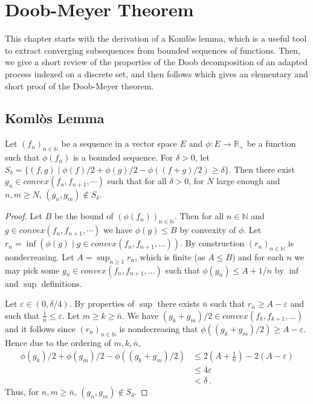 \chapter{Doob-Meyer Theorem}
\label{chap:doob_meyer}


This chapter starts with the derivation of a Komlòs lemma, which is a useful tool to extract converging subsequences from bounded sequences of functions.
Then, we give a short review of the properties of the Doob decomposition of an adapted process indexed on a discrete set, and then follows \cite{Beiglböck_Schachermayer_Veliyev_2012} which gives an elementary and short proof of the Doob-Meyer theorem.




\section{Komlòs Lemma}



\begin{lemma}\label{lem:komlos_convex}
  \leanok
Let $(f_n)_{n\in\mathbb{N}}$ be a sequence in a vector space $E$ and $\phi : E \to \mathbb{R}_+$ be a function such that $\phi(f_n)$ is a bounded sequence.
For $\delta > 0$, let $S_\delta = \{(f, g) \mid \phi(f)/2 + \phi(g)/2 - \phi((f+g)/2) \ge \delta\}$.
Then there exist $g_n\in convex(f_n,f_{n+1},\cdots)$ such that for all $\delta > 0$, for $N$ large enough and $n, m \ge N$, $(g_n, g_m) \notin S_\delta$.
\end{lemma}

\begin{proof}
  \leanok
Let $B$ be the bound of $(\phi(f_n))_{n\in\mathbb{N}}$.
Then for all $n\in\mathbb{N}$ and $g\in convex(f_n,f_{n+1},\cdots)$ we have $\phi(g)\le B$ by convexity of $\phi$.
Let $r_n = \inf(\phi(g) \mid g\in convex(f_n, f_{n+1},\ldots))$.
By construction $(r_n)_{n\in\mathbb{N}}$ is nondecreasing.
Let $A = \sup_{n \ge 1} r_n$, which is finite (as $A \le B$) and for each $n$ we may pick some $g_n\in convex(f_n, f_{n+1},\ldots)$ such that $\phi(g_n) \le A+1/n$ by $\inf$ and $\sup$ definitions.

Let $\varepsilon \in (0, \delta/4)$.
By properties of $\sup$ there exists $\bar{n}$ such that $r_{\bar{n}} \ge A-\varepsilon$ and such that $\frac{1}{\bar{n}} \le \varepsilon$.
Let $m \ge k \ge \bar{n}$.
We have $(g_k+g_m)/2 \in convex(f_k,f_{k+1},\ldots)$ and it follows since $(r_n)_{n\in\mathbb{N}}$ is nondecreasing that $\phi((g_k+g_m)/2) \ge A - \varepsilon$.
Hence due to the ordering of $m,k,\bar{n}$,
\begin{align*}
  \phi(g_k)/2 + \phi(g_m)/2 - \phi((g_k+g_m)/2)
  &\le 2(A + \frac{1}{\bar{n}}) - 2(A - \varepsilon)
  \\
  &\le 4 \varepsilon
  \\
  &< \delta
  \: .
\end{align*}
Thus, for $n, m \ge \bar{n}$, $(g_n, g_m) \notin S_\delta$.
\end{proof}


